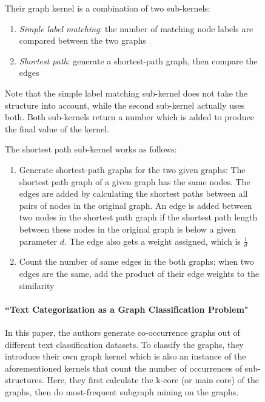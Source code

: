 \begin{figure}[ht]
Their graph kernel is a combination of two sub-kernels:
\begin{enumerate}
    \item{\textit{Simple label matching}: the number of matching node labels are compared between the two graphs}
    \item{\textit{Shortest path}: generate a shortest-path graph, then compare the edges}
\end{enumerate}
Note that the simple label matching sub-kernel does not take the structure into account, while the second sub-kernel actually uses both.
Both sub-kernels return a number which is added to produce the final value of the kernel.

The shortest path sub-kernel works as follows:
\begin{enumerate}
    \item{Generate shortest-path graphs for the two given graphs: The shortest path graph of a given graph has the same nodes.
    The edges are added by calculating the shortest paths between all pairs of nodes in the original graph. An edge is added between two nodes in the shortest path graph if the shortest path length between these nodes in the original graph is below a given parameter $d$. The edge also gets a weight assigned, which is $\frac{1}{d}$}
    \item{Count the number of same edges in the both graphs: when two edges are the same, add the product of their edge weights to the similarity}
\end{enumerate}


\paragraph{``Text Categorization as a Graph Classification Problem" \cite{Rousseau2015a}}
In this paper, the authors generate co-occurrence graphs out of different text classification datasets.
To classify the graphs, they introduce their own graph kernel which is also an instance of the aforementioned kernels that count the number of occurrences of sub-structures.
Here, they first calculate the k-core (or main core) of the graphs, then do most-frequent subgraph mining on the graphs.


\end{figure}
